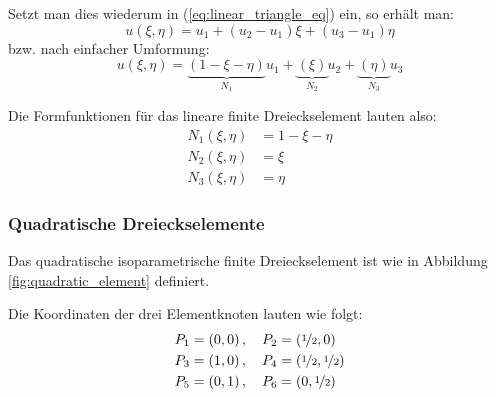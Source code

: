 Setzt man dies wiederum in (\ref{eq:linear_triangle_eq}) ein, so erhält man:
\begin{equation}
u(\xi, \eta) = u_1 + (u_2 - u_1)\xi + (u_3 - u_1)\eta
\end{equation}
bzw. nach einfacher Umformung:
\begin{equation}
u(\xi, \eta) = \underbrace{(1 - \xi - \eta)}_{N_1} u_1 + \underbrace{(\xi)}_{N_2} u_2 + \underbrace{(\eta)}_{N_3} u_3
\end{equation}

Die Formfunktionen für das lineare finite Dreieckselement lauten also:
	\begin{align}
		N_1(\xi, \eta) &= 1 - \xi - \eta \\
		N_2(\xi, \eta) &= \xi \nonumber \\
		N_3(\xi, \eta) &= \eta \nonumber
	\end{align}
	
	
	
	

\subsubsection{Quadratische Dreieckselemente}
Das quadratische isoparametrische finite Dreieckselement ist wie in Abbildung \ref{fig:quadratic_element} definiert.

Die Koordinaten der drei Elementknoten lauten wie folgt:
\begin{align}
&P_1 = \left(0, 0 \right), \quad P_2 = \left(\nicefrac{1}{2}, 0 \right)\\
&P_3 = \left(1, 0 \right), \quad P_4 = \left(\nicefrac{1}{2}, \nicefrac{1}{2} \right) \nonumber \\
&P_5 = \left(0, 1 \right), \quad P_6 = \left(0, \nicefrac{1}{2} \right) \nonumber
\end{align}

